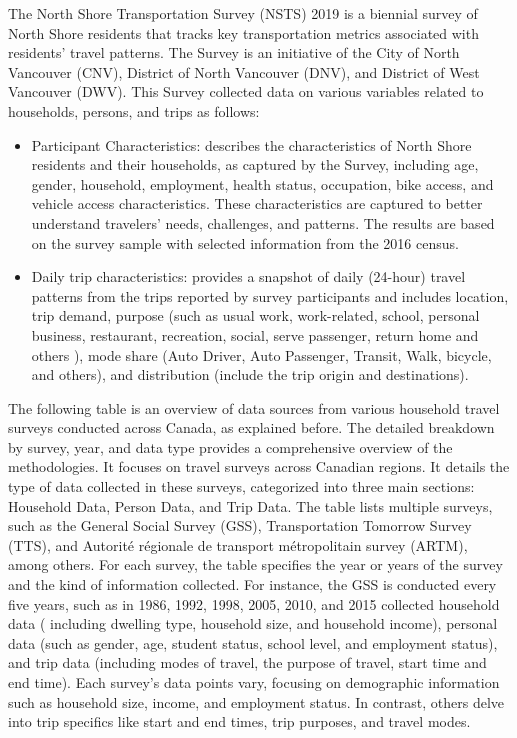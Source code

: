 \documentclass[12pt,twoside]{reedthesis}
\begin{document}
The North Shore Transportation Survey (NSTS) 2019 is a biennial survey of North Shore residents that tracks key transportation metrics associated with residents' travel patterns. The Survey is an initiative of the City of North Vancouver (CNV), District of North Vancouver (DNV), and District of West Vancouver (DWV). This Survey collected data on various variables related to households, persons, and trips as follows:
\begin{itemize}
\item
  Participant Characteristics: describes the characteristics of North Shore residents and their households, as captured by the Survey, including age, gender, household, employment, health status, occupation, bike access, and vehicle access characteristics. These characteristics are captured to better understand travelers' needs, challenges, and patterns. The results are based on the survey sample with selected information from the 2016 census.
\item
  Daily trip characteristics: provides a snapshot of daily (24-hour) travel patterns from the trips reported by survey participants and includes location, trip demand, purpose (such as usual work, work-related, school, personal business, restaurant, recreation, social, serve passenger, return home and others ), mode share (Auto Driver, Auto Passenger, Transit, Walk, bicycle, and others), and distribution (include the trip origin and destinations).
\end{itemize}
The following table is an overview of data sources from various household travel surveys conducted across Canada, as explained before. The detailed breakdown by survey, year, and data type provides a comprehensive overview of the methodologies. It focuses on travel surveys across Canadian regions. It details the type of data collected in these surveys, categorized into three main sections: Household Data, Person Data, and Trip Data. The table lists multiple surveys, such as the General Social Survey (GSS), Transportation Tomorrow Survey (TTS), and Autorité régionale de transport métropolitain survey (ARTM), among others. For each survey, the table specifies the year or years of the survey and the kind of information collected. For instance, the GSS is conducted every five years, such as in 1986, 1992, 1998, 2005, 2010, and 2015 collected household data ( including dwelling type, household size, and household income), personal data (such as gender, age, student status, school level, and employment status), and trip data (including modes of travel, the purpose of travel, start time and end time). Each survey's data points vary, focusing on demographic information such as household size, income, and employment status. In contrast, others delve into trip specifics like start and end times, trip purposes, and travel modes.
\end{document}
